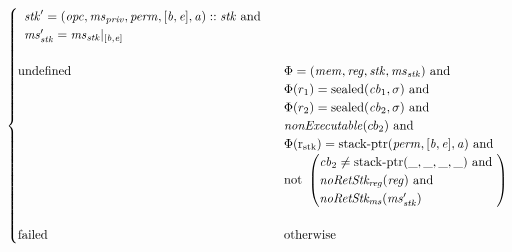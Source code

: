 \documentclass[a4paper]{article}
\newcommand{\shareddom}[1]{\mathrm{#1}}
\newcommand{\perm}{\var{perm}}
\newcommand{\stkptr}[1]{\mathrm{stack\text{-}ptr}(#1)}
\newcommand{\sealed}[1]{\shareddom{sealed}(#1)}
\newcommand{\failed}{\mathrm{failed}}
\newcommand{\tundefined}{\mathrm{undefined}}
\newcommand{\var}[1]{\mathit{#1}}
\newcommand{\reg}{\var{reg}}
\newcommand{\mem}{\var{mem}}
\newcommand{\ms}{\var{ms}}
\newcommand{\stk}{\var{stk}}
\newcommand{\priv}{\var{priv}}
\newcommand{\opc}{\var{opc}}
\newcommand{\cb}{\var{cb}}
\newcommand{\baddr}{\var{b}}
\newcommand{\eaddr}{\var{e}}
\newcommand{\aaddr}{\var{a}}
\newcommand{\stdrng}{[\baddr,\eaddr]}
\newcommand{\rstk}{\mathrm{r}_\mathrm{stk}}
\newcommand{\plainfun}[2]{
  \ifthenelse{\equal{#2}{}}
  {\mathit{#1}}
  {\mathit{#1}(#2)}
}
\newcommand{\nonExec}[1]{\plainfun{nonExecutable}{#1}}
\newcommand{\noRetStkReg}[1]{\plainfun{noRetStk_{reg}}{#1}}
\newcommand{\noRetStkMs}[1]{\plainfun{noRetStk_{ms}}{#1}}
\begin{document}
\begin{align*}
\begin{cases}
\begin{array}[t]{l}
                                        \stk' = (\opc,\ms_\priv,\perm,\stdrng,\aaddr) :: \stk \text{ and } \\
                                        \ms_\stk' = \ms_\stk |_{[\baddr,\eaddr]}
                                      \end{array}\\
                                      & \\
      \tundefined & \arraycolsep=0pt
                                      \begin{array}[t]{l}
                                        \Phi = (\mem,\reg,\stk,\ms_\stk) \text{ and } \\
                                        \Phi(r_1) = \sealed{\cb_1,\sigma} \text{ and } \\
                                        \Phi(r_2) = \sealed{\cb_2,\sigma} \text{ and } \\
                                        \nonExec{cb_2} \text{ and } \\
                                        \Phi(\rstk) = \stkptr{\perm, \stdrng, \aaddr} \text{ and } \\
                                        \text{not } \arraycolsep=0pt
                                        \left(\begin{array}{l}
                                          \cb_2 \neq \stkptr{\_,\_,\_,\_} \text{ and } \\
                                          \noRetStkReg{\reg} \text{ and } \\
                                          \noRetStkMs{\ms_\stk'}
                                        \end{array} \right)
                                      \end{array}\\
                                      & \\
      \failed & \text{otherwise}
    \end{cases}
\end{align*}
\end{document}

